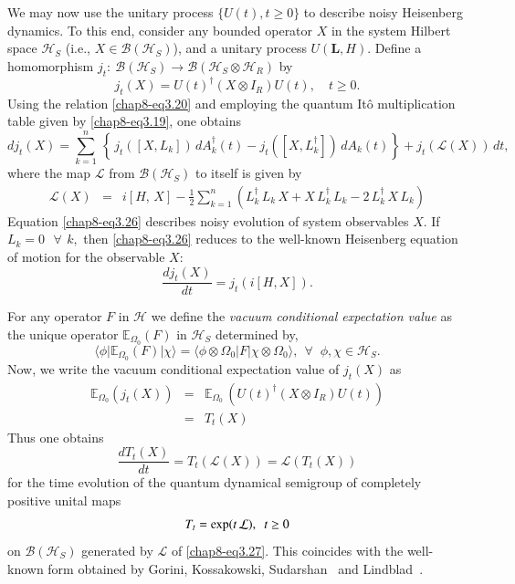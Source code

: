 We may now use the unitary process $\{U(t), t\geq 0\}$ to describe  noisy Heisenberg dynamics. To this end, consider any bounded operator $X$ in the system Hilbert space $\mathcal{H}_S$ (i.e., $X\in \mathcal{B}(\mathcal{H}_S)$),  and a unitary process $U\!(\mathbf{L}, H)$. Define a homomorphism $j_t:  \ \mathcal{B}(\mathcal{H}_S)\longrightarrow 
\mathcal{B}(\mathcal{H}_S\otimes\mathcal{H}_R)$ by 
\begin{equation}
j_t (X) = U(t)^{\dagger} (X \otimes I_R)  U(t), \quad t \ge 0. \label{chap8-eq3.25}
\end{equation}
Using the relation \eqref{chap8-eq3.20} and employing the quantum It\^{o} multiplication table given by \eqref{chap8-eq3.19},  one obtains 
\begin{equation}
dj_t(X)= \sum_{k=1}^{n}\, \left\{\, j_t\left([X, L_k]\right)\, dA^\dag_k(t)  - j_t\left([X,L_k^\dag]\right)\, dA_k(t) \right\} +j_t\left(\mathcal{L}(X)\right)\, dt,   \label{chap8-eq3.26}
\end{equation}
where   the map $\mathcal{L}$  from $\mathcal{B}(\mathcal{H}_S)$ to itself is given by 
\begin{eqnarray}
\mathcal{L}(X)&=& i\left[ H,\,  X\right]- \frac{1}{2} \sum_{k=1}^{n}\left(L^\dag_k\, L_k\, X + X\, L^\dag_k\, L_k -2\, L^\dag_k\, X\, L_k\right)  \label{chap8-eq3.27}
\end{eqnarray} 
Equation \eqref{chap8-eq3.26} describes noisy evolution of system observables $X$. If  $L_{k}=0 \ \ \ \forall\ \,k,$ then \eqref{chap8-eq3.26} reduces to the well-known Heisenberg equation of motion for the observable $X$:
$$
\frac{d j_t (X)}{dt} = j_t (i [H,X]).
$$

For any operator $F$ in $\mathcal{H}$ we define the {\it vacuum conditional expectation value} as the unique operator $\mathbb{E}_{\Omega_0} (F)$ in $\mathcal{H}_S$ determined by,
\begin{equation} 
\langle \phi\vert \mathbb{E}_{\Omega_0} (F) \vert \chi\rangle= \langle \phi\otimes \Omega_0 |F| \chi \otimes \Omega_0\rangle,\ \ \forall\,\, \ \phi,\chi \in \mathcal{H}_S. \label{chap8-eq3.28}
\end{equation}
Now, we write the vacuum conditional expectation value of $j_t (X)$ as   
\begin{eqnarray}
\mathbb{E}_{\Omega_0} \left(j_t(X)\right)&=&\mathbb{E}_{\Omega_0}\, \left(U(t)^{\dagger} (X \otimes I_R)  U(t)\right)\nonumber \\ 
&=&T_t(X) \label{chap8-eq3.29}
\end{eqnarray} 
Thus one obtains 
\begin{equation}
\frac{d T_t (X)}{dt} = T_t (\mathcal{L}(X))=\mathcal{L}\left(T_t(X)\right) \label{chap8-eq3.30}
\end{equation} 
for the time evolution of the quantum dynamical semigroup of completely positive unital maps 
\begin{equation}
T_t={\rm exp}( t\, \mathcal{L}),\ \  t\geq 0 \label{chap8-eq3.31}
\end{equation}  
on $\mathcal{B}(\mathcal{H}_S)$ generated by  $\mathcal{L}$ of \eqref{chap8-eq3.27}.  This coincides with the well-known form obtained by Gorini, Kossakowski, Sudarshan~\cite{chap8-key1} and Lindblad~\cite{chap8-key2}.  

